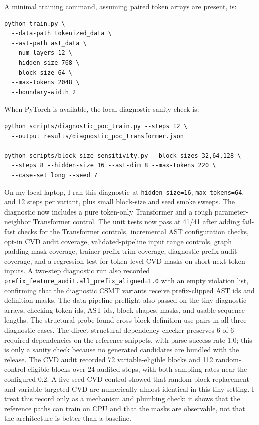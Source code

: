 \documentclass[10pt]{article}
\begin{document}
A minimal training command, assuming paired token arrays are present, is:
\begin{verbatim}
python train.py \
  --data-path tokenized_data \
  --ast-path ast_data \
  --num-layers 12 \
  --hidden-size 768 \
  --block-size 64 \
  --max-tokens 2048 \
  --boundary-width 2
\end{verbatim}

When PyTorch is available, the local diagnostic sanity check is:
\begin{verbatim}
python scripts/diagnostic_poc_train.py --steps 12 \
  --output results/diagnostic_poc_transformer.json

python scripts/block_size_sensitivity.py --block-sizes 32,64,128 \
  --steps 8 --hidden-size 16 --ast-dim 8 --max-tokens 220 \
  --case-set long --seed 7
\end{verbatim}

On my local laptop, I ran this diagnostic at
\texttt{hidden\_size=16}, \texttt{max\_tokens=64}, and 12 steps per variant,
plus small block-size and seed smoke sweeps.  The diagnostic now includes a pure
token-only Transformer and a rough parameter-neighbor Transformer control.  The
unit tests now pass at 41/41 after adding fail-fast checks for the Transformer
controls, incremental AST configuration checks, opt-in CVD audit coverage,
validated-pipeline input range controls, graph padding-mask coverage, trainer
prefix-trim coverage, diagnostic prefix-audit coverage, and a regression test
for token-level CVD masks on short next-token inputs.  A two-step diagnostic
run also recorded \texttt{prefix\_feature\_audit.all\_prefix\_aligned=1.0} with
an empty violation list, confirming that the diagnostic CSMT variants receive
prefix-clipped AST ids and definition masks.  The data-pipeline preflight also passed on the tiny
diagnostic arrays, checking token ids, AST ids, block shapes, masks, and usable
sequence lengths.
The structural probe found cross-block definition-use pairs in all three
diagnostic cases.  The direct structural-dependency checker preserves 6 of 6
required dependencies on the reference snippets, with parse success rate 1.0;
this is only a sanity check because no generated candidates are bundled with
the release.  The CVD audit recorded 72 variable-eligible blocks and 112
random-control eligible blocks over 24 audited steps, with both sampling rates
near the configured 0.2.  A five-seed CVD control showed that random block
replacement and variable-targeted CVD are numerically almost identical in this
tiny setting.  I treat this record only as a mechanism and plumbing check: it
shows that the reference paths can train on CPU and that the masks are
observable, not that the architecture is better than a baseline.
\end{document}
